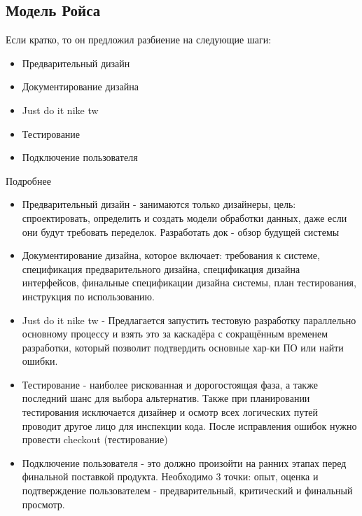 \documentclass{article}
\begin{document}
\subsection{Модель Ройса}
Если кратко, то он предложил разбиение на следующие шаги:
\begin{itemize}
    \item Предварительный дизайн
    \item Документирование дизайна
    \item Just do it nike tw
    \item Тестирование
    \item Подключение пользователя
\end{itemize}
Подробнее
\begin{itemize}
    \item Предварительный дизайн - занимаются только дизайнеры, цель: спроектировать, определить и создать модели обработки данных, даже если они будут требовать переделок. Разработать док - обзор будущей системы
    \item Документирование дизайна, которое включает: требования к системе, спецификация предварительного
    дизайна, спецификация дизайна интерфейсов, финальные спецификации дизайна системы, план
    тестирования, инструкция по использованию.
    \item Just do it nike tw - Предлагается запустить тестовую разработку параллельно основному процессу и взять это за каскадёра с сокращённым временем разработки, который позволит подтвердить основные хар-ки ПО или найти ошибки. 
    \item Тестирование - наиболее рискованная и дорогостоящая фаза, а также последний шанс для выбора альтернатив. Также при планировании тестирования исключается дизайнер и осмотр всех логических путей проводит другое лицо для инспекции кода. После исправления ошибок нужно провести checkout (тестирование)
    \item Подключение пользователя - это должно произойти на ранних этапах перед финальной поставкой продукта. Необходимо 3 точки: опыт, оценка и подтверждение пользователем - предварительный, критический и финальный просмотр.
\end{itemize}
\end{document}
